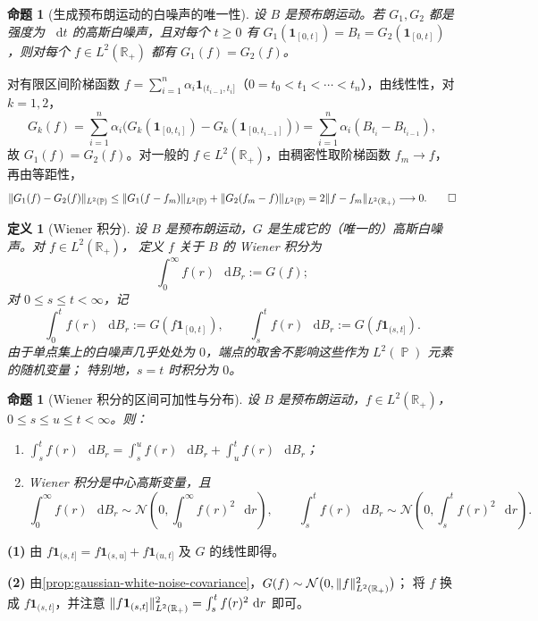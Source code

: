 \documentclass[UTF8,11pt,a4paper,oneside,fontset=fandol]{ctexrep}
\makeatletter
\numberwithin{equation}{section}
\theoremstyle{zhthm}
\newtheorem{proposition}[theorem]{命题}
\newtheorem{definition}[theorem]{定义}
\renewenvironment{proof}[1][\proofname]{\par
  \pushQED{\qed}%
  \normalfont\topsep6\p@\@plus6\p@\relax
  \trivlist
  \item[\hskip\labelsep\bfseries#1\hspace{0.5em}]\ignorespaces
}{%
  \popQED\endtrivlist\@endpefalse
}
\renewcommand{\proofname}{证明}
\newcommand{\R}{\mathbb{R}}
\DeclareMathOperator{\Prob}{\mathbb{P}}
\newcommand{\Normal}{\mathcal{N}}
\newcommand{\ind}[1]{\mathbf{1}_{#1}}
\newcommand{\dd}{\mathop{}\!\mathrm{d}}
\DeclarePairedDelimiter{\norm}{\lVert}{\rVert}
\makeatother
\begin{document}
\begin{proposition}[生成预布朗运动的白噪声的唯一性]
\label{prop:pre-brownian-white-noise-uniqueness}
设 $B$ 是预布朗运动。若 $G_1,G_2$ 都是强度为 $\dd t$ 的高斯白噪声，且对每个 $t\ge0$ 有
$G_1(\ind{[0,t]})=B_t=G_2(\ind{[0,t]})$，则对每个 $f\in L^2(\R_+)$ 都有 $G_1(f)=G_2(f)$。
\end{proposition}

\begin{proof}
对有限区间阶梯函数 $f=\sum_{i=1}^{n}\alpha_i\ind{(t_{i-1},t_i]}$（$0=t_0<t_1<\cdots<t_n$），由线性性，对 $k=1,2$，
\[
  G_k(f)=\sum_{i=1}^{n}\alpha_i\bigl(G_k(\ind{[0,t_i]})-G_k(\ind{[0,t_{i-1}]})\bigr)
  =\sum_{i=1}^{n}\alpha_i(B_{t_i}-B_{t_{i-1}}),
\]
故 $G_1(f)=G_2(f)$。对一般的 $f\in L^2(\R_+)$，由稠密性取阶梯函数 $f_m\to f$，再由等距性，
\[
  \norm{G_1(f)-G_2(f)}_{L^2(\Prob)}
  \le\norm{G_1(f-f_m)}_{L^2(\Prob)}+\norm{G_2(f_m-f)}_{L^2(\Prob)}
  =2\norm{f-f_m}_{L^2(\R_+)}\longrightarrow0.\qedhere
\]
\end{proof}

\begin{definition}[Wiener 积分]
\label{def:wiener-integral}
设 $B$ 是预布朗运动，$G$ 是生成它的（唯一的）高斯白噪声。对 $f\in L^2(\R_+)$，
定义 $f$ 关于 $B$ 的 Wiener 积分为
\[
  \int_0^\infty f(r)\,\dd B_r:=G(f);
\]
对 $0\le s\le t<\infty$，记
\[
  \int_0^t f(r)\,\dd B_r:=G(f\ind{[0,t]}),\qquad
  \int_s^t f(r)\,\dd B_r:=G(f\ind{(s,t]}).
\]
由于单点集上的白噪声几乎处处为 $0$，端点的取舍不影响这些作为 $L^2(\Prob)$ 元素的随机变量；
特别地，$s=t$ 时积分为 $0$。
\end{definition}

\begin{proposition}[Wiener 积分的区间可加性与分布]
\label{prop:wiener-integral-additivity-law}
设 $B$ 是预布朗运动，$f\in L^2(\R_+)$，$0\le s\le u\le t<\infty$。则：
\begin{enumerate}
  \item $\displaystyle\int_s^t f(r)\,\dd B_r=\int_s^u f(r)\,\dd B_r+\int_u^t f(r)\,\dd B_r$；
  \item Wiener 积分是中心高斯变量，且
    \[
      \int_0^\infty f(r)\,\dd B_r\sim\Normal\!\left(0,\int_0^\infty f(r)^2\,\dd r\right),\qquad
      \int_s^t f(r)\,\dd B_r\sim\Normal\!\left(0,\int_s^t f(r)^2\,\dd r\right).
    \]
\end{enumerate}
\end{proposition}

\begin{proof}
\textbf{(1)} 由 $f\ind{(s,t]}=f\ind{(s,u]}+f\ind{(u,t]}$ 及 $G$ 的线性即得。

\textbf{(2)} 由\cref{prop:gaussian-white-noise-covariance}，$G(f)\sim\Normal\bigl(0,\norm{f}_{L^2(\R_+)}^2\bigr)$；
将 $f$ 换成 $f\ind{(s,t]}$，并注意 $\norm{f\ind{(s,t]}}_{L^2(\R_+)}^2=\int_s^tf(r)^2\,\dd r$ 即可。
\end{proof}
\end{document}
